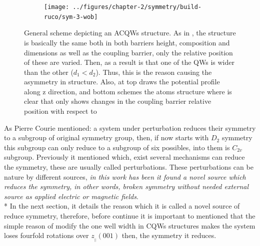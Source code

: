 \begin{figure}[ht!]
	\centering
	\begin{subfigure}{\textwidth}
	\texttt{[image: ../figures/chapter-2/symmetry/build-ruco/sym-3-wob]}
	\label{subfig:subsubsec:chapter-2-acoupled-quantum-wells-a}
	\label{subfig:subsubsec:chapter-2-acoupled-quantum-wells-b}
	\end{subfigure}
	\caption
	{
	General scheme  depicting an ACQWs structure. As in , the structure is basically the same both in both barriers height, composition and dimensions as well as the coupling barrier, only the relative position of these are varied. Then, as a result is that one of the QWs is wider than the other ($d_{1}<d_{2}$). Thus, this is the reason causing the asymmetry in structure. Also, at top  draws the potential profile along z direction, and bottom  schemes the atoms structure where is clear that only shows changes in the coupling barrier relative position with respect to 
	}
	\label{fig:subsubsec:chapter-2-acoupled-quantum-wells}
\end{figure}

As Pierre Courie mentioned\cite{curie1894symetrie,sep-symmetry-breaking,shubnikov1988works}:  a system under perturbation reduces their symmetry to a subgroup of  original symmetry group, then, if now starts with $D_{2}$ symmetry this subgroup can only reduce to a subgroup of six possibles, into them is $C_{2v}$ subgroup. Previously it mentioned which, exist several mechanisms can reduce the symmetry, these are usually called  perturbations. These perturbations can be nature by different sources, \emph{in this work  has been it found a novel source which reduces the symmetry,  in other words,  broken symmetry  without needed external source as applied electric or magnetic fields}.  \\*
In the next section, it details the reason which it is called  a novel source of reduce symmetry, therefore, before continue it is important to mentioned that the simple reason of modify the one well width in \gls{CQWs} structures makes the system loses fourfold rotations over $z_{_{\parallel}}(001)$  then, the symmetry it reduces. 

